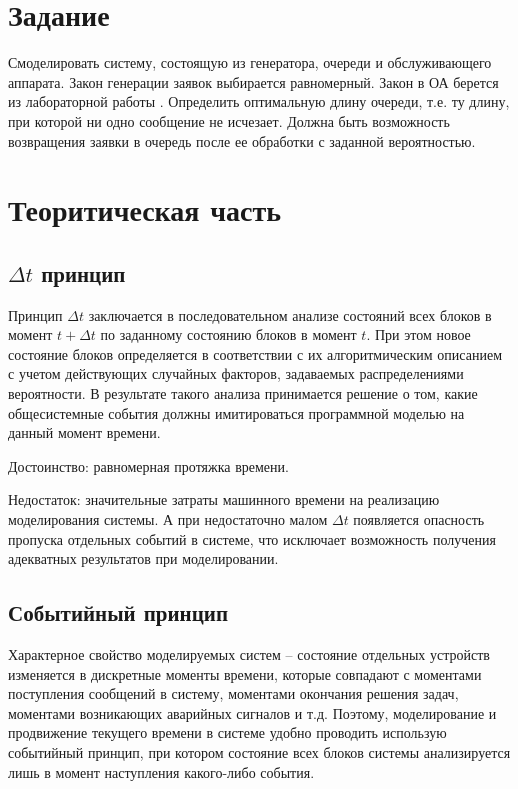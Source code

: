 \section{Задание}

Смоделировать систему, состоящую из генератора, очереди и обслуживающего аппарата.
Закон генерации заявок выбирается равномерный.
Закон в ОА берется из лабораторной работы .
Определить оптимальную длину очереди, т.е. ту длину, при которой ни одно сообщение не исчезает.
Должна быть возможность возвращения заявки в
очередь после ее обработки с заданной вероятностью.


\section{Теоритическая часть}

\subsection{$\Delta t$ принцип}

Принцип $\Delta t$ заключается в последовательном анализе состояний всех блоков в момент $t + \Delta t$ по заданному состоянию блоков в момент $t$. При этом новое состояние блоков определяется в соответствии с их алгоритмическим описанием с учетом действующих случайных факторов, задаваемых распределениями вероятности. В результате такого анализа принимается решение о том, какие общесистемные события должны имитироваться программной моделью на данный момент времени.

Достоинство: равномерная протяжка времени.

Недостаток: значительные затраты машинного времени на реализацию моделирования системы. А при недостаточно малом $\Delta t$ появляется опасность пропуска отдельных событий в системе, что исключает возможность получения адекватных результатов при моделировании.

\subsection{Событийный принцип}

Характерное свойство моделируемых систем -- состояние отдельных устройств изменяется в дискретные моменты времени, которые совпадают с моментами поступления сообщений в систему, моментами окончания решения задач, моментами возникающих аварийных сигналов и т.д. Поэтому, моделирование и продвижение текущего времени в системе удобно проводить использую событийный принцип, при котором состояние всех блоков системы анализируется лишь в момент наступления какого-либо события.

